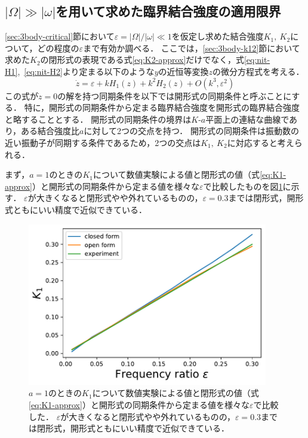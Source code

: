 \documentclass[../main]{subfiles}
\begin{document}
\subsection{$|\Omega|\gg|\omega|$を用いて求めた臨界結合強度の適用限界}
\ref{sec:3body-critical}節において$\varepsilon=|\Omega|/|\omega|\ll 1$を仮定し求めた結合強度$K_1,\ K_2$について，どの程度の$\varepsilon$まで有効か調べる．
ここでは，\ref{sec:3body-k12}節において求めた$K_2$の閉形式の表現である式\eqref{eq:K2-approx}だけでなく，式\eqref{eq:nit-H1},\ \eqref{eq:nit-H2}より定まる以下のような$y$の近恒等変換$z$の微分方程式を考える．
\begin{equation}
    \label{eq:k1k2-open}
    \dot{z}=\varepsilon+kH_1(z)+k^2H_2(z)+O(k^3,\varepsilon^2)
\end{equation}
この式が$\dot{z}=0$の解を持つ同期条件を以下では開形式の同期条件と呼ぶことにする．
特に，開形式の同期条件から定まる臨界結合強度を開形式の臨界結合強度と略することとする．
開形式の同期条件の境界は$K$-$a$平面上の連結な曲線であり，ある結合強度比$a$に対して2つの交点を持つ．
開形式の同期条件は振動数の近い振動子が同期する条件であるため，2つの交点は$K_1,\ K_2$に対応すると考えられる．

まず，$a=1$のときの$K_1$について数値実験による値と閉形式の値（式\eqref{eq:K1-approx}）と開形式の同期条件から定まる値を様々な$\varepsilon$で比較したものを図\ref{fig:k1-compare}に示す．
$\varepsilon$が大きくなると閉形式やや外れているものの，$\varepsilon=0.3$までは閉形式，開形式ともにいい精度で近似できている．

\begin{figure}[tbp]
\centering
\includegraphics[width=105mm]{./images/k1-compare.pdf}
\centering
\caption{$a=1$のときの$K_1$について数値実験による値と閉形式の値（式\eqref{eq:K1-approx}）と開形式の同期条件から定まる値を様々な$\varepsilon$で比較した．
$\varepsilon$が大きくなると閉形式やや外れているものの，$\varepsilon=0.3$までは閉形式，開形式ともにいい精度で近似できている．}
\label{fig:k1-compare}
\end{figure}
\end{document}

